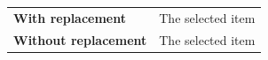 \documentclass{article}
\begin{document}
\begin{tabularx}{\textwidth}{>{\bfseries}p{38mm} X}
\toprule
\rowcolor{gray!20}With replacement & The selected item \\
Without replacement & The selected item \\
\bottomrule
\end{tabularx}
\end{document}
